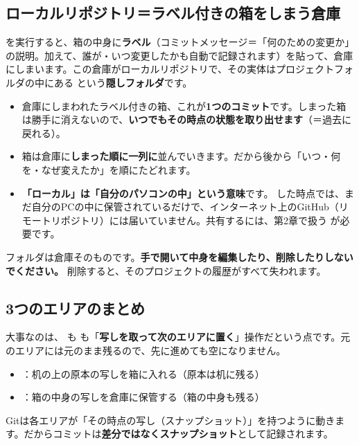 \subsection{ローカルリポジトリ＝ラベル付きの箱をしまう倉庫}

 を実行すると、箱の中身に\textbf{ラベル}（コミットメッセージ＝「何のための変更か」の説明。加えて、誰が・いつ変更したかも自動で記録されます）を貼って、倉庫にしまいます。この倉庫がローカルリポジトリで、その実体はプロジェクトフォルダの中にある  という\textbf{隠しフォルダ}です。

\begin{itemize}[leftmargin=1.4em]
  \item 倉庫にしまわれたラベル付きの箱、これが\textbf{1つのコミット}です。しまった箱は勝手に消えないので、\textbf{いつでもその時点の状態を取り出せます}（＝過去に戻れる）。
  \item 箱は倉庫に\textbf{しまった順に一列に}並んでいきます。だから後から「いつ・何を・なぜ変えたか」を順にたどれます。
  \item \textbf{「ローカル」は「自分のパソコンの中」という意味}です。 した時点では、まだ自分のPCの中に保管されているだけで、インターネット上のGitHub（リモートリポジトリ）には届いていません。共有するには、第2章で扱う  が必要です。
\end{itemize}

\begin{warnbox}
 フォルダは倉庫そのものです。\textbf{手で開いて中身を編集したり、削除したりしないでください。} 削除すると、そのプロジェクトの履歴がすべて失われます。
\end{warnbox}

\subsection{3つのエリアのまとめ}

大事なのは、 も  も「\textbf{写しを取って次のエリアに置く}」操作だという点です。元のエリアには元のまま残るので、先に進めても空になりません。

\begin{itemize}[leftmargin=1.4em]
  \item {}：机の上の原本の写しを箱に入れる（原本は机に残る）
  \item {}：箱の中身の写しを倉庫に保管する（箱の中身も残る）
\end{itemize}

\begin{notebox}
Gitは各エリアが「その時点の写し（スナップショット）」を持つように動きます。だからコミットは\textbf{差分ではなくスナップショット}として記録されます。
\end{notebox}


